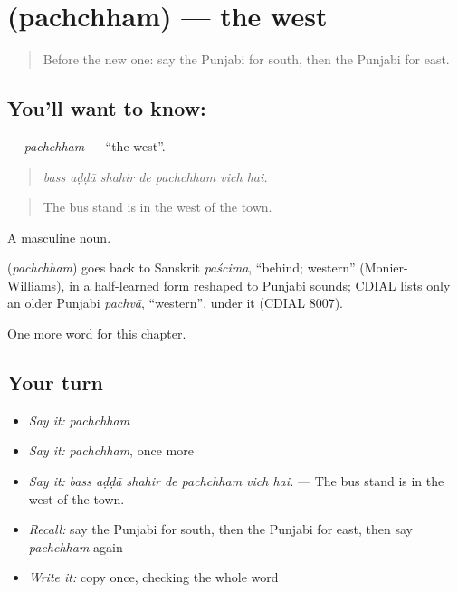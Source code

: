 \section[\texorpdfstring{\pa{ਪੱਛਮ} (pachchham)}{ਪੱਛਮ (pachchham)}]{ (pachchham) — the west}

\label{lesson:PA-C271-pachchham}



\begin{quote}
Before the new one: say the Punjabi for south, then the Punjabi for east.
\end{quote}

\subsection*{You'll want to know: }
\textbf{} — \emph{pachchham} — \textquotedblleft{}the west\textquotedblright{}.

\begin{quote}
      
\end{quote}

\begin{quote}
\emph{bass aḍḍā shahir de pachchham vich hai.}
\end{quote}

\begin{quote}
The bus stand is in the west of the town.
\end{quote}

A masculine noun.

\begin{cousinweb}
\textbf{} (\emph{pachchham}) goes back to Sanskrit \emph{paścima}, \textquotedblleft{}behind; western\textquotedblright{} (Monier-Williams), in a half-learned form reshaped to Punjabi sounds; CDIAL lists only an older Punjabi \emph{pachvā}, \textquotedblleft{}western\textquotedblright{}, under it (CDIAL 8007).
\end{cousinweb}

\begin{grammarlens}[title={What you've built}]
One more word for this chapter.
\end{grammarlens}

\subsection*{Your turn}
\begin{itemize}
\raggedright
  \item \emph{Say it:} \emph{pachchham}
  \item \emph{Say it:} \emph{pachchham}, once more
  \item \emph{Say it:} \emph{bass aḍḍā shahir de pachchham vich hai.} — The bus stand is in the west of the town.
  \item \emph{Recall:} say the Punjabi for south, then the Punjabi for east, then say \emph{pachchham} again
  \item \emph{Write it:} copy \textbf{} once, checking the whole word
\end{itemize}

